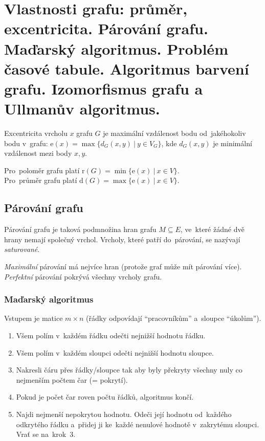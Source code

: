 \clearpage
\section{Vlastnosti grafu: průměr, excentricita. Párování grafu. Maďarský algoritmus. Problém časové tabule. Algoritmus barvení grafu. Izomorfismus grafu a Ullmanův algoritmus.}

Excentricita vrcholu $x$ grafu $G$ je maximální vzdálenost bodu od~jakéhokoliv bodu v~grafu: $\mathrm{e}(x) = \max\{ d_G(x, y) \ |\ y \in V_G\}$, kde $d_G(x,y)$ je minimální vzdálenost mezi body $x, y$.

{}Pro~poloměr grafu platí $\mathrm{r}(G) = \min\{ \mathrm{e}(x)\ |\ x \in V \}$.
\\Pro~průměr grafu platí $\mathrm{d}(G) = \max\{ \mathrm{e}(x)\ |\ x \in V \}$.

\subsection{Párování grafu}

Párování grafu je taková podmnožina hran grafu $M \subseteq E$, ve~které žádné dvě hrany nemají společný vrchol.
Vrcholy, které patří do~párování, se nazývají \emph{saturované}.

{}\emph{Maximální} párování má nejvíce hran (protože graf může mít párování více).
\\\emph{Perfektní} párování pokrývá všechny vrcholy grafu.

\subsubsection{Maďarský algoritmus}

Vstupem je matice $m \times n$ (řádky odpovídají \enquote{pracovníkům} a~sloupce \enquote{úkolům}).

\begin{enumerate}
    \item Všem polím v~každém řádku odečti nejnižší hodnotu řádku.
    \item Všem polím v~každém sloupci odečti nejnižší hodnotu sloupce.
    \item Nakresli čáru přes řádky/sloupce tak aby byly překryty všechny nuly co nejmenším počtem čar (= pokrytí).
    \item Pokud je počet čar roven počtu řádků, algoritmus končí.
    \item Najdi nejmenší nepokrytou hodnotu. Odeči její hodnotu od~každého odkrytého řádku a~přidej ji ke~každé nenulové hodnotě v~zakrytému sloupci. Vrať se na~krok~3.
\end{enumerate}

